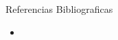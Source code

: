 \documentclass[10pt,letterpaper,final]{article}
\begin{document}
Referencias Bibliograficas


\begin{itemize}
   \item \cite{bachute2021autonomous}

   
\end{itemize}

\nocite{*}


\end{document}
